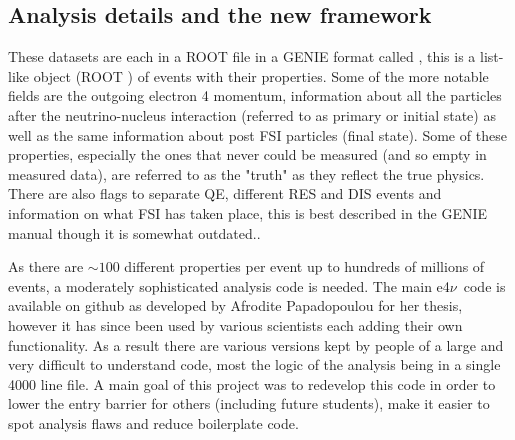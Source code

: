 \documentclass[a4paper,12pt]{article}
\newcommand{\efn}{e4$\nu$}
\newcommand{\verbb}[1]{\text{\Verb|#1|}}
\begin{document}
\subsection{Analysis details and the new framework}\label{sec:code}
These datasets are each in a ROOT file in a GENIE format called \verbb{gst}, this is a list-like object (ROOT \verbb{TTree}) of events with their properties.
Some of the more notable fields are the outgoing electron 4 momentum, information about all the particles after the neutrino-nucleus interaction (referred to as primary or initial state) as well as the same information about post FSI particles (final state).
Some of these properties, especially the ones that never could be measured (and so empty in measured data), are referred to as the "truth" as they reflect the true physics.
There are also flags to separate QE, different RES and DIS events and information on what FSI has taken place, this is best described in the GENIE manual\cite{andreopoulosGENIENeutrinoMonte2015} though it is somewhat outdated..

As there are $\sim100$ different properties per event up to hundreds of millions of events, a moderately sophisticated analysis code is needed.
The main \efn\ code is available on github \cite{E4nuE4nuanalysiscodePlaceholder} as developed by Afrodite Papadopoulou for her thesis\cite{papadopoulouLeptonNucleusScatteringMeasurements2023}, however it has since been used by various scientists each adding their own functionality.
As a result there are various versions kept by people of a large and very difficult to understand code, most the logic of the analysis being in a single 4000 line file.
A main goal of this project was to redevelop this code in order to lower the entry barrier for others (including future students), make it easier to spot analysis flaws and reduce boilerplate code.
\end{document}
